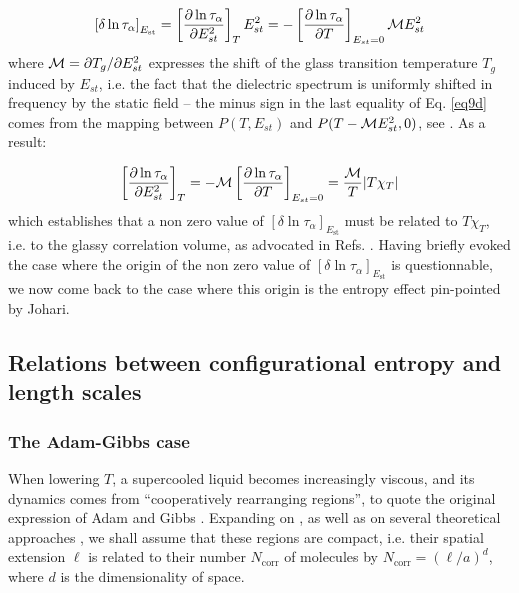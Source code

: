 \documentclass[single column,pre]{revtex4}
\begin{document}
\begin{equation}
\left[ \delta \ln{\tau_{\alpha}} \right]_{E_{\text{st}}} =  \left[ \frac{ \partial \ln{\tau_{\alpha}}}{\partial E_{st}^2}\right]_{T} E_{st}^2 
= - \left[ \frac{ \partial \ln{\tau_{\alpha}}}{\partial T}\right]_{E_{st}=0} {\cal{M}} E_{st}^2
\label{eq9d}
\end{equation}
where ${\cal{M}} = \partial T_g /\partial E_{st}^2$ expresses the shift of the glass transition temperature $T_g$ induced by $E_{st}$, i.e. the fact that the dielectric spectrum is uniformly shifted in frequency by the static field -- the minus sign in the last equality of Eq. \ref{eq9d} comes from the mapping between $P(T, E_{st})$ and $P(T-{\cal M}E_{st}^2, 0)$, see \cite{Lho14}. As a result:

\begin{equation}
\left[ \frac{ \partial \ln{\tau_{\alpha}}}{\partial E_{st}^2}\right]_{T}
= -{\cal{M}} \left[ \frac{ \partial \ln{\tau_{\alpha}}}{\partial T}\right]_{E_{st}=0} 
 = \frac{{\cal{M}}}{T} \vert T\chi_T \vert
\label{eq9e}
\end{equation}
which establishes that a non zero value of $\left[ \delta \ln{\tau_{\alpha}} \right]_{E_{\text{st}}}$ must be related to $T\chi_T$, i.e. to the glassy correlation volume, as advocated in Refs. \cite{Ber05,Dal07}. Having briefly evoked the case where the origin of the non zero   
value of $\left[ \delta \ln{\tau_{\alpha}} \right]_{E_{\text{st}}}$ is questionnable, we now come back to the case where this origin is the entropy effect pin-pointed by Johari.



\subsection{\label{partA2} Relations between configurational entropy and length scales}
\subsubsection{\label{partA2-1} The Adam-Gibbs case}

When lowering $T$, a supercooled liquid becomes increasingly viscous, and its dynamics comes from ``cooperatively rearranging regions'', to quote the original expression of 
Adam and Gibbs \cite{Ada65}. Expanding on \cite{Alb16}, as well as on several theoretical approaches \cite{RFOT,Gilles}, we shall assume that these regions are compact, i.e. their 
spatial extension $\ell$ is related to their number $N_{\text{corr}}$ of molecules by $N_{\text{corr}} = (\ell /a)^d$, where $d$ is the dimensionality of space.
\end{document}
